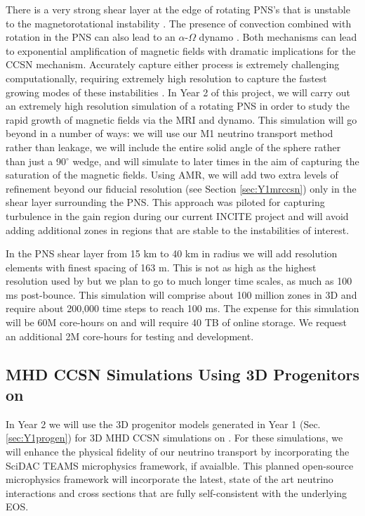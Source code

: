 There is a very strong shear layer at the edge of rotating PNS's that is unstable to the magnetorotational instability \citep[MRI,][]{Akiyama:2003, Burrows:2007}.
The presence of convection combined with rotation in the PNS can also lead to an $\alpha$-$\Omega$ dynamo \citep{Mosta:2015}.
Both mechanisms can lead to exponential amplification of magnetic fields with dramatic implications for the CCSN mechanism.
Accurately capture either process is extremely challenging computationally, requiring extremely high resolution to capture the fastest growing modes of these instabilities \citep{Mosta:2015}.
In Year 2 of this project, we will carry out an extremely high resolution simulation of a rotating PNS in order to study the rapid growth of magnetic fields via the MRI and dynamo.
This simulation will go beyond \citet{Mosta:2015} in a number of ways: we will use our M1 neutrino transport method rather than leakage, we will include the entire solid angle of the sphere rather than just a 90$^\circ$ wedge, and will simulate to later times in the aim of capturing the saturation of the magnetic fields.
Using AMR, we will add two extra levels of refinement beyond our fiducial resolution (see Section \ref{sec:Y1mrccsn}) only in the shear layer surrounding the PNS.
This approach was piloted for capturing turbulence in the gain region during our current INCITE project and will avoid adding additional zones in regions that are stable to the instabilities of interest.

In the PNS shear layer from 15 km to 40 km in radius we will add resolution elements with finest spacing of 163 m.
This is not as high as the highest resolution used by \citet{Mosta:2015} but we plan to go to much longer time scales, as much as 100 ms post-bounce.
This simulation will comprise about 100 million zones in 3D and require about 200,000 time steps to reach 100 ms.
The expense for this simulation will be 60M core-hours on \mira and will require 40 TB of online storage. We request an additional 2M core-hours for testing and development.

\subsection{MHD CCSN Simulations Using 3D Progenitors on \thet}

In Year 2 we will use the 3D progenitor models generated in Year 1 (Sec. \ref{sec:Y1progen}) for 3D MHD CCSN simulations on \thet.
For these simulations, we will enhance the physical fidelity of our neutrino transport by incorporating the SciDAC TEAMS microphysics framework, if avaialble.
This planned open-source microphysics framework will incorporate the latest, state of the art neutrino interactions and cross sections that are fully self-consistent with the underlying EOS.


